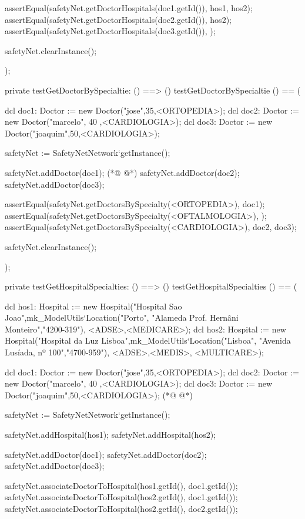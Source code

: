 \begin{vdmpp}[breaklines=true]
  assertEqual(safetyNet.getDoctorHospitals(doc1.getId()), {hos1, hos2});
  assertEqual(safetyNet.getDoctorHospitals(doc2.getId()), {hos2});
  assertEqual(safetyNet.getDoctorHospitals(doc3.getId()), {});  
  
  safetyNet.clearInstance();
    
);

private testGetDoctorBySpecialtie: () ==> ()
 testGetDoctorBySpecialtie () == (
 
  dcl doc1: Doctor := new Doctor("jose",35,<ORTOPEDIA>);
  dcl doc2: Doctor := new Doctor("marcelo", 40 ,<CARDIOLOGIA>);
  dcl doc3: Doctor := new Doctor("joaquim",50,<CARDIOLOGIA>);
  
  safetyNet := SafetyNetNetwork`getInstance();
  
  safetyNet.addDoctor(doc1);
(*@
\label{testGetDoctorById:454}
@*)
  safetyNet.addDoctor(doc2);
  safetyNet.addDoctor(doc3);

  assertEqual(safetyNet.getDoctorsBySpecialty(<ORTOPEDIA>), {doc1});
  assertEqual(safetyNet.getDoctorsBySpecialty(<OFTALMOLOGIA>), {});
  assertEqual(safetyNet.getDoctorsBySpecialty(<CARDIOLOGIA>), {doc2, doc3});  
  
  safetyNet.clearInstance();
    
);

private testGetHospitalSpecialties: () ==> ()
 testGetHospitalSpecialties () == (
 
  dcl hos1: Hospital := new Hospital("Hospital Sao Joao",mk_ModelUtils`Location("Porto", "Alameda Prof. Hernâni Monteiro","4200-319"), {<ADSE>,<MEDICARE>});
  dcl hos2: Hospital := new Hospital("Hospital da Luz Lisboa",mk_ModelUtils`Location("Lisboa", "Avenida Lusíada, nº 100","4700-959"), {<ADSE>,<MEDIS>, <MULTICARE>});
  
  dcl doc1: Doctor := new Doctor("jose",35,<ORTOPEDIA>);
  dcl doc2: Doctor := new Doctor("marcelo", 40 ,<CARDIOLOGIA>);
  dcl doc3: Doctor := new Doctor("joaquim",50,<CARDIOLOGIA>);
(*@
\label{testAddPatient:474}
@*)
  
  safetyNet := SafetyNetNetwork`getInstance();
   
  safetyNet.addHospital(hos1);
  safetyNet.addHospital(hos2);
  
  safetyNet.addDoctor(doc1);
  safetyNet.addDoctor(doc2);
  safetyNet.addDoctor(doc3);

  safetyNet.associateDoctorToHospital(hos1.getId(), doc1.getId());
  safetyNet.associateDoctorToHospital(hos2.getId(), doc1.getId());
  safetyNet.associateDoctorToHospital(hos2.getId(), doc2.getId());


\end{vdmpp}
